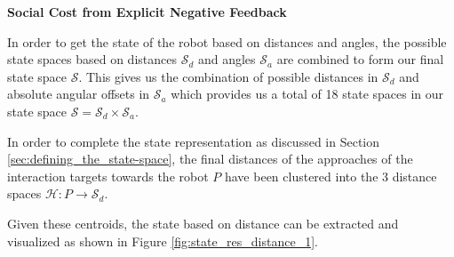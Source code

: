 \documentclass[a4paper,11pt]{report}
\begin{document}
{\bf Social Cost from Explicit Negative Feedback}

In order to get the state of the robot based on distances and angles, the possible state spaces based on distances $\mathcal{S}_d$ and angles $\mathcal{S}_a$ are combined to form our final state space $\mathcal{S}$. 
This gives us the combination of possible distances in $\mathcal{S}_d$ and absolute angular offsets in $\mathcal{S}_a$ which provides us a total of 18 state spaces in our state space $\mathcal{S} = \mathcal{S}_d \times \mathcal{S}_a$. 

In order to complete the state representation as discussed in Section \ref{sec:defining_the_state-space}, the final distances of the approaches of the interaction targets towards the robot $P$ have been clustered into the 3 distance spaces $\mathcal{H}:P \rightarrow \mathcal{S}_d$. %

Given these centroids, the state based on distance can be extracted and visualized as shown in Figure \ref{fig:state_res_distance_1}.
\end{document}

